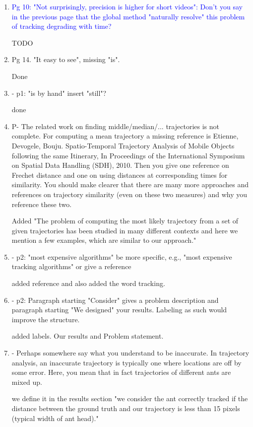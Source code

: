\documentclass[12pt]{article}
\begin{document}
\begin{enumerate}
\item \textcolor{blue}{Pg 10: "Not surprisingly, precision is higher for short videos": Don’t you say in the previous page that the global method "naturally resolve" this problem of tracking degrading with time?
}

TODO

\item Pg 14. "It easy to see", missing "is".

Done




\item - p1: "is by hand" insert "still"?

done

\item {P- The related work on finding middle/median/... trajectories is not complete. For computing a mean trajectory a missing reference is
Etienne, Devogele, Bouju. Spatio-Temporal Trajectory Analysis of Mobile Objects following the same Itinerary, In Proceedings of the International Symposium on Spatial Data Handling (SDH), 2010.
Then you give one reference on Frechet distance and one on using distances at corresponding times for similarity. You should make clearer that there are many more approaches and references on trajectory similarity (even on these two measures) and why you reference these two.
}

Added "The problem of computing the most likely trajectory from a set of
given trajectories has been studied in many different contexts and here we mention a few examples, which are similar to our approach." 
\item - p2: "most expensive algorithms" be more specific, e.g., "most expensive tracking algorithms" or give a reference

added reference and also added the word tracking.

\item {- p2: Paragraph starting "Consider" gives a problem description and paragraph starting "We designed" your results. Labeling as such would improve the structure.
}

added labels. Our results and Problem statement.

\item {- Perhaps somewhere say what you understand to be inaccurate. In trajectory analysis, an inaccurate trajectory is typically one where locations are off by some error. Here, you mean that in fact trajectories of different ants are mixed up.
}

we define it in the results section "we consider the ant correctly tracked if the distance
between the ground truth and our trajectory is less than 15 pixels (typical width of ant head)."


\end{enumerate}
\end{document}
